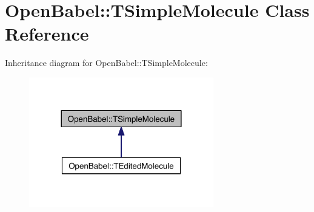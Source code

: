 \hypertarget{class_open_babel_1_1_t_simple_molecule}{\section{Open\-Babel\-:\-:T\-Simple\-Molecule Class Reference}
\label{class_open_babel_1_1_t_simple_molecule}
}


Inheritance diagram for Open\-Babel\-:\-:T\-Simple\-Molecule\-:
\nopagebreak
\begin{figure}[H]
\begin{center}
\leavevmode
\includegraphics[width=228pt]{class_open_babel_1_1_t_simple_molecule__inherit__graph}
\end{center}
\end{figure}

